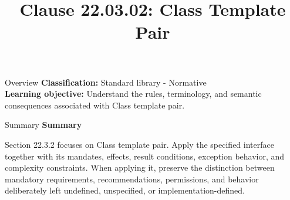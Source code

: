 \documentclass[10pt,letterpaper]{article}
\title{Clause 22.03.02: Class Template Pair}
\author{}
\date{}
\begin{document}
\maketitle
\begin{CornellOverviewBox}{Overview}
\textbf{Classification:} Standard library - Normative\\[2pt]
\textbf{Learning objective:} Understand the rules, terminology, and semantic consequences associated with Class template pair.
\end{CornellOverviewBox}\begin{CornellSummaryBox}{Summary}
{\sffamily\bfseries\color{Accent} Summary}\par\vspace{3pt}Section 22.3.2 focuses on Class template pair. Apply the specified interface together with its mandates, effects, result conditions, exception behavior, and complexity constraints. When applying it, preserve the distinction between mandatory requirements, recommendations, permissions, and behavior deliberately left undefined, unspecified, or implementation-defined.
\end{CornellSummaryBox}
\end{document}
